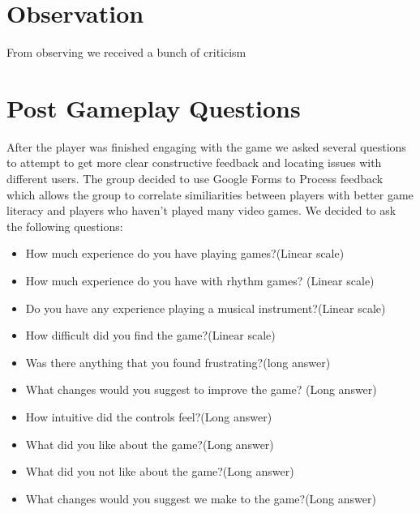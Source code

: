 \documentclass[twoside,twocolumn]{article}
\begin{document}


\section{Observation}

From observing we received a bunch of criticism




\section{Post Gameplay Questions}
After the player was finished engaging with the game we asked several questions to
attempt to get more clear constructive feedback and locating issues with different
 users. The group decided to use Google Forms to Process feedback which allows the group
 to correlate similiarities between players with better game literacy and players who haven't played many video games. We decided to ask the following questions:

\begin{itemize}
\item How much experience do you have playing games?(Linear scale)
\item How much experience do you have with rhythm games? (Linear scale)
\item Do you have any experience playing a musical instrument?(Linear scale)
\item How difficult did you find the game?(Linear scale)
\item Was there anything that you found frustrating?(long answer)
\item What changes would you suggest to improve the game? (Long answer)
\item How intuitive did the controls feel?(Long answer)
\item What did you like about the game?(Long answer)
\item What did you not like about the game?(Long answer)
\item What changes would you suggest we make to the game?(Long answer)
\end{itemize}


\end{document}
